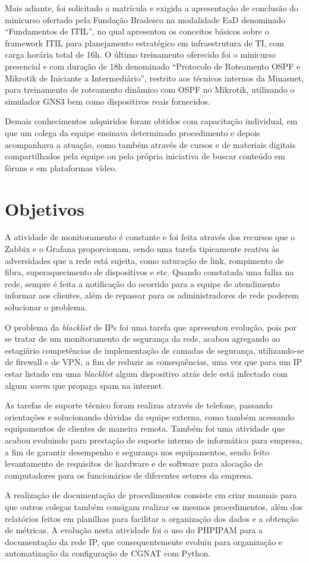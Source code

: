     Mais adiante, foi solicitado a matrícula e exigida a apresentação de conclusão do minicurso ofertado pela Fundação Bradesco na modalidade EaD denominado ``Fundamentos de ITIL'', no qual apresentou os conceitos básicos sobre o framework ITIL para planejamento estratégico em infraestrutura de TI, com carga horária total de 16h. O último treinamento oferecido foi o minicurso presencial e com duração de 18h denominado ``Protocolo de Roteamento OSPF e Mikrotik de Iniciante a Intermediário'', restrito aos técnicos internos da Minasnet, para treinamento de roteamento dinâmico com OSPF no Mikrotik, utilizando o simulador GNS3 bem como dispositivos reais fornecidos.
    
    Demais conhecimentos adquiridos foram obtidos com capacitação individual, em que um colega da equipe ensinava determinado procedimento e depois acompanhava a atuação, como também através de cursos e de materiais digitais compartilhados pela equipe ou pela própria iniciativa de buscar conteúdo em fóruns e em plataformas vídeo.
    
\section{Objetivos}

    A atividade de monitoramento é constante e foi feita através dos recursos que o Zabbix e o Grafana proporcionam, sendo uma tarefa tipicamente reativa às adversidades que a rede está sujeita, como saturação de link, rompimento de fibra, superaquecimento de dispositivos e etc. Quando constatada uma falha na rede, sempre é feita a notificação do ocorrido para a equipe de atendimento informar aos clientes, além de repassar para os administradores de rede poderem solucionar o problema.
    
    O problema da \textit{blacklist} de IPs foi uma tarefa que apresentou evolução, pois por se tratar de um monitoramento de segurança da rede, acabou agregando ao estagiário competências de implementação de camadas de segurança, utilizando-se de firewall e de VPN, a fim de reduzir as consequências, uma vez que para um IP estar listado em uma \textit{blacklist} algum dispositivo atrás dele está infectado com algum \textit{worm} que propaga spam na internet.
    
    As tarefas de suporte técnico foram realizas através de telefone, passando orientações e solucionando dúvidas da equipe externa, como também acessando equipamentos de clientes de maneira remota. Também foi uma atividade que acabou evoluindo para prestação de suporte interno de informática para empresa, a fim de garantir desempenho e segurança nos equipamentos, sendo feito levantamento de requisitos de hardware e de software para alocação de computadores para os funcionários de diferentes setores da empresa.
    
    A realização de documentação de procedimentos consiste em criar manuais para que outros colegas também consigam realizar os mesmos procedimentos, além dos relatórios feitos em planilhas para facilitar a organização dos dados e a obtenção de métricas. A evolução nesta atividade foi o uso do PHPIPAM para a documentação da rede IP, que consequentemente evoluiu para organização e automatização da configuração de CGNAT com Python.
